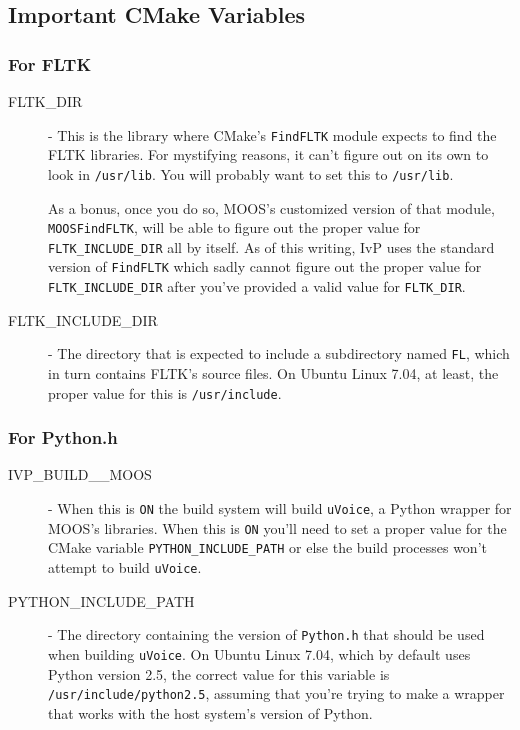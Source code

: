 \documentclass[letterpaper,10pt]{article}
\begin{document}
\subsection{Important CMake Variables}
\subsubsection{For FLTK}
\begin{description}
 \item[FLTK\_DIR] - This is the library where CMake's \verb|FindFLTK| module expects to 
	find the FLTK libraries.  For mystifying reasons, it can't figure out on its own
	to look in \verb|/usr/lib|.  You will probably want to set this to \verb|/usr/lib|.

	As a bonus, once you do so, MOOS's customized version of that module, \verb|MOOSFindFLTK|,
	will be able to figure out the proper value for \verb|FLTK_INCLUDE_DIR| all by itself.
	As of this writing, IvP uses the standard version of \verb|FindFLTK| which sadly
	cannot figure out the proper value for \verb|FLTK_INCLUDE_DIR| after you've provided
	a valid value for \verb|FLTK_DIR|.

 \item[FLTK\_INCLUDE\_DIR] - The directory that is expected to include a subdirectory 
	named \verb|FL|,
	which in turn contains FLTK's source files.  On Ubuntu Linux 7.04, at least, the 
	proper value for this is \verb|/usr/include|.
 \end{description}

\subsubsection{For Python.h}
\begin{description}
 \item[IVP\_BUILD\_\_MOOS] - When this is \verb|ON| the build system will build \verb|uVoice|,
	a Python
	wrapper for MOOS's libraries.  When this is \verb|ON| you'll need to set a proper
	value for the CMake variable \verb|PYTHON_INCLUDE_PATH| or else the build processes
	won't attempt to build \verb|uVoice|.

 \item[PYTHON\_INCLUDE\_PATH] - The directory containing the version of \verb|Python.h| that
	should be used when building \verb|uVoice|.  On Ubuntu Linux 7.04, which by default
	uses Python version 2.5, the correct value for this variable is 
	\verb|/usr/include/python2.5|, assuming that you're trying to make a wrapper that
	works with the host system's version of Python.
 \end{description}
\end{document}
